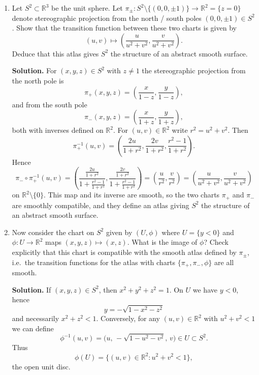 \documentclass[12pt,a4paper]{article}
\theoremstyle{plain}
\theoremstyle{definition}      %
\begin{document}
	\begin{enumerate}[label=\textnormal{(\alph*)}]
		
		\item
		Let $S^2 \subset \mathbb{R}^3$ be the unit sphere.
		Let $\pi_{\pm} : S^2 \setminus \{(0,0,\pm 1)\} \to \mathbb{R}^2 = \{z=0\}$
		denote stereographic projection from the north / south poles $(0,0,\pm1)\in S^2$.
		Show that the transition function between these two charts is given by
		\[
		(u,v) \longmapsto \left( \frac{u}{u^{2}+v^{2}}, \frac{v}{u^{2}+v^{2}} \right).
		\]
		Deduce that this atlas gives $S^2$ the structure of an abstract smooth surface.
		
		\medskip
		\textbf{Solution.}
		For $(x,y,z)\in S^2$ with $z\neq 1$ the stereographic projection from the north
		pole is
		\[
		\pi_+(x,y,z) = \left(\frac{x}{1-z}, \frac{y}{1-z}\right),
		\]
		and from the south pole
		\[
		\pi_-(x,y,z) = \left(\frac{x}{1+z}, \frac{y}{1+z}\right),
		\]
		both with inverses defined on $\mathbb{R}^2$.
		For $(u,v)\in\mathbb{R}^2$ write $r^2 = u^2+v^2$.  Then
		\[
		\pi_+^{-1}(u,v)
		= \left(
		\frac{2u}{1+r^2},
		\frac{2v}{1+r^2},
		\frac{r^2-1}{1+r^2}
		\right).
		\]
		Hence
		\[
		\pi_- \circ \pi_+^{-1}(u,v)
		= \left(
		\frac{\frac{2u}{1+r^2}}{1+\frac{r^2-1}{1+r^2}},
		\frac{\frac{2v}{1+r^2}}{1+\frac{r^2-1}{1+r^2}}
		\right)
		= \left(
		\frac{u}{r^2},
		\frac{v}{r^2}
		\right)
		= \left(
		\frac{u}{u^{2}+v^{2}},
		\frac{v}{u^{2}+v^{2}}
		\right)
		\]
		on $\mathbb{R}^2 \setminus \{0\}$.  This map and its inverse are smooth,
		so the two charts $\pi_+$ and $\pi_-$ are smoothly compatible, and they define
		an atlas giving $S^2$ the structure of an abstract smooth surface.
		
		\medskip
		
		\item
		Now consider the chart on $S^2$ given by $(U,\phi)$ where
		$U = \{ y < 0 \}$ and $\phi : U \to \mathbb{R}^2$ maps $(x,y,z) \mapsto (x,z)$.
		What is the image of $\phi$?
		Check explicitly that this chart is compatible with the smooth atlas defined
		by $\pi_{\pm}$, i.e.\ the transition functions for the atlas with charts
		$\{\pi_{+},\pi_{-},\phi\}$ are all smooth.
		
		\medskip
		\textbf{Solution.}
		If $(x,y,z)\in S^2$, then $x^2+y^2+z^2=1$.  On $U$ we have $y<0$, hence
		\[
		y = -\sqrt{1-x^2-z^2}
		\]
		and necessarily $x^2+z^2 < 1$.
		Conversely, for any $(u,v)\in\mathbb{R}^2$ with $u^2+v^2<1$ we can define
		\[
		\phi^{-1}(u,v) = \bigl(u,\,-\sqrt{1-u^2-v^2},\,v\bigr) \in U \subset S^2.
		\]
		Thus
		\[
		\phi(U) = \{(u,v)\in\mathbb{R}^2 : u^2+v^2<1\},
		\]
		the open unit disc.
		

\end{enumerate}
\end{document}
